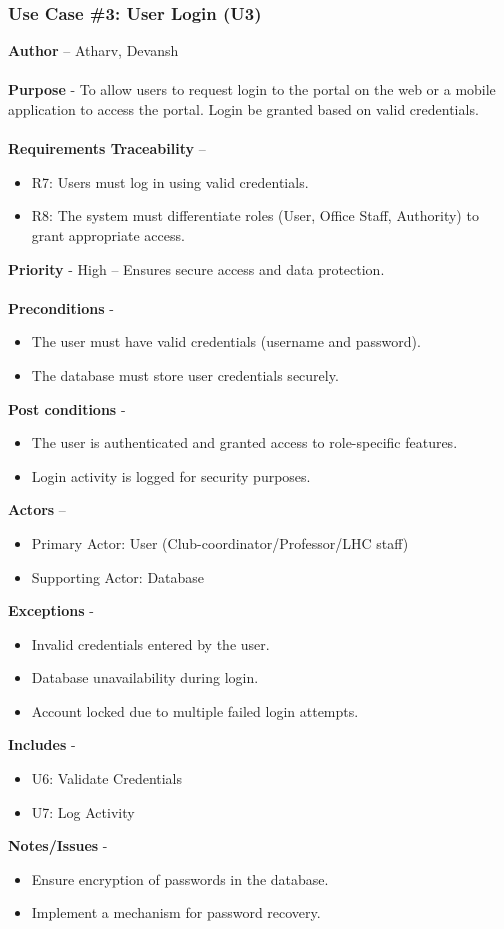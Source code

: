 \documentclass[a4paper,12pt]{article}
\begin{document}
 \subsubsection{Use Case \#3: User Login (U3)}
\textbf{Author} – Atharv, Devansh \\\\
\textbf{Purpose} - To allow users to request login to the portal on the web or a mobile application to access the portal. Login be granted based on valid credentials.  \\\\
\textbf{Requirements Traceability} – 
\begin{itemize} 
    \item R7: Users must log in using valid credentials.
    \item R8: The system must differentiate roles (User, Office Staff, Authority) to grant appropriate access.
\end{itemize}
\textbf{Priority} - High – Ensures secure access and data protection. \\\\
\textbf{Preconditions} - 
\begin{itemize} 
    \item The user must have valid credentials (username and password).
    \item The database must store user credentials securely.
\end{itemize}
\textbf{Post conditions} - 
\begin{itemize} 
    \item The user is authenticated and granted access to role-specific features.
    \item Login activity is logged for security purposes.
\end{itemize}
\textbf{Actors} – 
\begin{itemize} 
    \item Primary Actor: User (Club-coordinator/Professor/LHC staff)
    \item Supporting Actor: Database
\end{itemize}
\textbf{Exceptions} - 
\begin{itemize} 
    \item Invalid credentials entered by the user.
    \item Database unavailability during login.
    \item Account locked due to multiple failed login attempts.
\end{itemize}
\textbf{Includes} - 
\begin{itemize} 
    \item U6: Validate Credentials
    \item U7: Log Activity
\end{itemize}
\textbf{Notes/Issues} - 
\begin{itemize} 
    \item Ensure encryption of passwords in the database.
    \item Implement a mechanism for password recovery.
\end{itemize}
\newpage
\end{document}
